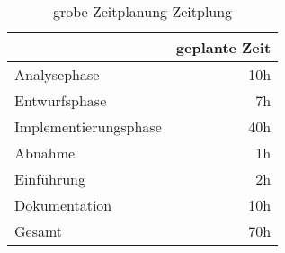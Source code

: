 \begin{table}[h]
\begin{tabular}{lr}
\rowcolor{gragreen}\multicolumn{1}{l}{\bf{Projektphase}}  & \multicolumn{1}{l}{\bf{geplante Zeit}} \\
\hline
Analysephase   & 10h \\

\rowcolor{odd}Entwurfsphase   & 7h \\

Implementierungsphase  &  40h \\

\rowcolor{odd}Abnahme &   1h \\
Einführung   & 2h \\
\rowcolor{odd}Dokumentation   & 10h \\

\hline
\rowcolor{heading}Gesamt  & 70h
\end{tabular}
\caption{grobe Zeitplanung Zeitplung}
\label{table:overviewtimetable}
\end{table}